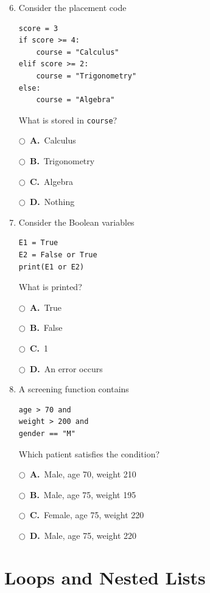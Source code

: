 \documentclass[11pt]{article}
\newcommand{\choice}[2]{%
    \par\noindent
    \(\bigcirc\)\ \textbf{#1.}\ #2
}
\begin{document}
\begin{enumerate}
\setcounter{enumi}{5}


\item Consider the placement code

\begin{verbatim}
score = 3
if score >= 4:
    course = "Calculus"
elif score >= 2:
    course = "Trigonometry"
else:
    course = "Algebra"
\end{verbatim}

What is stored in \texttt{course}?

\choice{A}{Calculus}
\choice{B}{Trigonometry}
\choice{C}{Algebra}
\choice{D}{Nothing}



\item Consider the Boolean variables

\begin{verbatim}
E1 = True
E2 = False or True
print(E1 or E2)
\end{verbatim}

What is printed?

\choice{A}{True}
\choice{B}{False}
\choice{C}{1}
\choice{D}{An error occurs}



\item A screening function contains

\begin{verbatim}
age > 70 and
weight > 200 and
gender == "M"
\end{verbatim}

Which patient satisfies the condition?

\choice{A}{Male, age 70, weight 210}
\choice{B}{Male, age 75, weight 195}
\choice{C}{Female, age 75, weight 220}
\choice{D}{Male, age 75, weight 220}

\end{enumerate}


\section*{Loops and Nested Lists}
\end{document}
